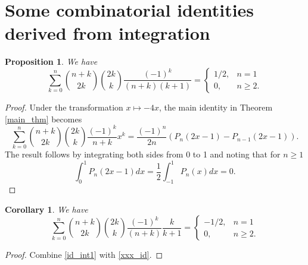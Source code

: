 \documentclass[11pt,reqno]{amsart}
\theoremstyle{plain}
\numberwithin{equation}{section}
\newtheorem{proposition}[thm]{Proposition}
\newtheorem{corollary}[thm]{Corollary}
\begin{document}
\section{Some combinatorial identities derived from integration}

\begin{proposition}
We have
\begin{equation}\label{id_int1}
\sum_{k=0}^{n} \binom{n+k}{2k} \binom{2k}{k} \frac{(-1)^k}{(n+k)(k+1)} = 
\begin{cases}
1/2, & n=1 \\ 
0, & n\geq 2.
\end{cases} 
\end{equation}
\end{proposition}
\begin{proof}
Under the transformation $x\mapsto -4x$, the main identity in Theorem \ref{main_thm} becomes
\begin{equation}\label{main_id_mod}
\sum_{k=0}^n \binom{n+k}{2k} \binom{2k}{k} \frac{(-1)^k}{n+k} x^k = \frac{(-1)^n}{2n} \left ( P_n(2x-1) - P_{n-1}(2x-1)\right ).
\end{equation}
The result follows by integrating both sides from 0 to 1 and noting that for $n\ge 1$
$$\int_0^1 P_n(2x-1) dx = \frac{1}{2}\int_{-1}^1 P_n(x) dx=0.$$
\end{proof}

\begin{corollary}
We have
\begin{equation}
\sum_{k=0}^{n} \binom{n+k}{2k} \binom{2k}{k} \frac{(-1)^k}{(n+k)}\frac{k}{k+1} = 
\begin{cases}
-1/2, & n=1 \\ 
0, & n\geq 2.
\end{cases} 
\end{equation}
\end{corollary}
\begin{proof}
Combine \eqref{id_int1} with \eqref{xxx_id}.
\end{proof}
\end{document}
